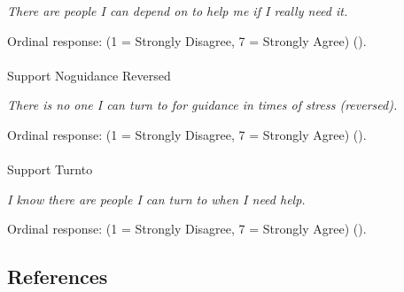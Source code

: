 \documentclass[
  single column]{article}
\makeatletter
\let\oldparagraph\paragraph
\renewcommand{\paragraph}{
    \@ifstar
      \xxxParagraphStar
      \xxxParagraphNoStar
  }
\newcommand{\xxxParagraphStar}[1]{\oldparagraph*{#1}\mbox{}}
\newcommand{\xxxParagraphNoStar}[1]{\oldparagraph{#1}\mbox{}}
\makeatother
\begin{document}
\emph{There are people I can depend on to help me if I really need it.}

Ordinal response: (1 = Strongly Disagree, 7 = Strongly Agree)
().

\paragraph{Support Noguidance
Reversed}\label{support-noguidance-reversed}

\emph{There is no one I can turn to for guidance in times of stress
(reversed).}

Ordinal response: (1 = Strongly Disagree, 7 = Strongly Agree)
().

\paragraph{Support Turnto}\label{support-turnto}

\emph{I know there are people I can turn to when I need help.}

Ordinal response: (1 = Strongly Disagree, 7 = Strongly Agree)
().

\newpage{}

\subsection*{References}\label{references}
\end{document}
